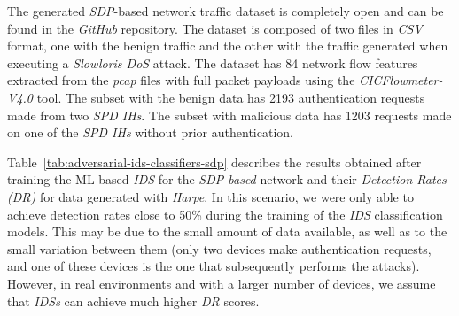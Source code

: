 The generated \textit{SDP}-based network traffic dataset is completely open and can be found in the
\textit{GitHub} repository.
The dataset is composed of two files in \textit{CSV} format, one with the benign traffic and the other with the traffic
generated when executing a \textit{Slowloris DoS} attack.
The dataset has 84 network flow features extracted from the \textit{pcap} files with full packet payloads using the
\textit{CICFlowmeter-V4.0} tool.
The subset with the benign data has 2193 authentication requests made from two \textit{SPD IHs}.
The subset with malicious data has 1203 requests made on one of the \textit{SPD IHs} without prior authentication.

Table~\ref{tab:adversarial-ids-classifiers-sdp} describes the results obtained after training the ML-based \textit{IDS}
for the \textit{SDP-based} network and their \textit{Detection Rates (DR)} for data generated with \textit{Harpe}.
In this scenario, we were only able to achieve detection rates close to 50\% during the training of the \textit{IDS}
classification models.
This may be due to the small amount of data available, as well as to the small variation between them (only two devices
make authentication requests, and one of these devices is the one that subsequently performs the attacks).
However, in real environments and with a larger number of devices, we assume that \textit{IDSs} can achieve much higher
\textit{DR} scores.

\begin{table}[t]
    \caption{Performance of the \textit{IDSs} classifiers with adversarial traffic on the generated \textit{SDP}-based network dataset.
    \label{tab:adversarial-ids-classifiers-sdp}}
\end{table}

